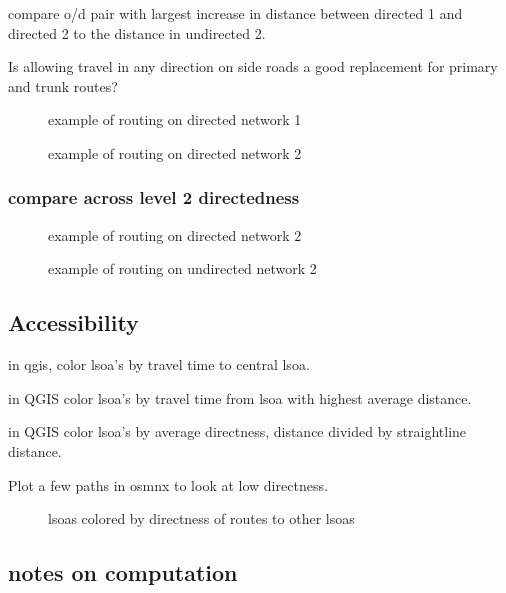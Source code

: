 compare o/d pair with largest increase in distance between directed 1 and directed 2 to the distance in undirected 2. 

Is allowing travel in any direction on side roads a good replacement for primary and trunk routes?


\begin{figure}
\centering
\caption{example of routing on directed network 1}
\label{fig:routing_1}
\end{figure}

\begin{figure}
\centering
\caption{example of routing on directed network 2}
\label{fig:routing_1}
\end{figure}

\subsubsection{compare across level 2 directedness}

\begin{figure}
\centering
\caption{example of routing on directed network 2}
\label{fig:routing_1}
\end{figure}

\begin{figure}
\centering
\caption{example of routing on undirected network 2}
\label{fig:routing_1}
\end{figure}


\subsection{Accessibility}

in qgis, color lsoa's by travel time to central lsoa. 

in QGIS color lsoa's by travel time from lsoa with highest average distance. 

in QGIS color lsoa's by  average directness, distance divided by straightline distance. 

Plot a few paths in osmnx to look at low directness. 


\begin{figure}
\centering
\caption{lsoas colored by directness of routes to other lsoas}
\label{fig:lsoa_directness}
\end{figure}

\subsection{notes on computation}


